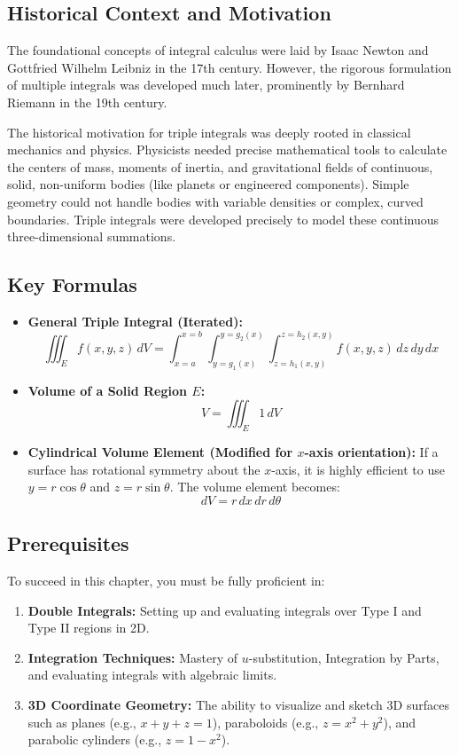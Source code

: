 \documentclass[12pt]{article}
\begin{document}
\subsection{Historical Context and Motivation}
The foundational concepts of integral calculus were laid by Isaac Newton and Gottfried Wilhelm Leibniz in the 17th century. However, the rigorous formulation of multiple integrals was developed much later, prominently by Bernhard Riemann in the 19th century. 

The historical motivation for triple integrals was deeply rooted in classical mechanics and physics. Physicists needed precise mathematical tools to calculate the centers of mass, moments of inertia, and gravitational fields of continuous, solid, non-uniform bodies (like planets or engineered components). Simple geometry could not handle bodies with variable densities or complex, curved boundaries. Triple integrals were developed precisely to model these continuous three-dimensional summations.

\subsection{Key Formulas}
\begin{itemize}
    \item \textbf{General Triple Integral (Iterated):} 
    \[ \iiint_E f(x,y,z) \, dV = \int_{x=a}^{x=b} \int_{y=g_1(x)}^{y=g_2(x)} \int_{z=h_1(x,y)}^{z=h_2(x,y)} f(x,y,z) \, dz \, dy \, dx \]
    \item \textbf{Volume of a Solid Region $E$:} 
    \[ V = \iiint_E 1 \, dV \]
    \item \textbf{Cylindrical Volume Element (Modified for $x$-axis orientation):}
    If a surface has rotational symmetry about the $x$-axis, it is highly efficient to use $y = r\cos\theta$ and $z = r\sin\theta$. The volume element becomes:
    \[ dV = r \, dx \, dr \, d\theta \]
\end{itemize}

\subsection{Prerequisites}
To succeed in this chapter, you must be fully proficient in:
\begin{enumerate}
    \item \textbf{Double Integrals:} Setting up and evaluating integrals over Type I and Type II regions in 2D.
    \item \textbf{Integration Techniques:} Mastery of $u$-substitution, Integration by Parts, and evaluating integrals with algebraic limits.
    \item \textbf{3D Coordinate Geometry:} The ability to visualize and sketch 3D surfaces such as planes (e.g., $x+y+z=1$), paraboloids (e.g., $z = x^2+y^2$), and parabolic cylinders (e.g., $z = 1-x^2$).
\end{enumerate}
\end{document}
